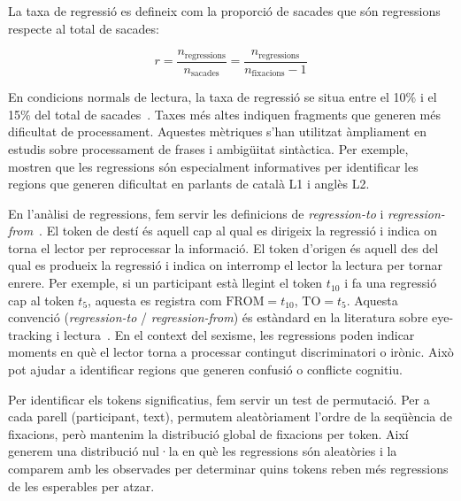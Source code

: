La taxa de regressió es defineix com la proporció de sacades que són regressions respecte al total de sacades:

\[
r = \frac{n_{\text{regressions}}}{n_{\text{sacades}}} = \frac{n_{\text{regressions}}}{n_{\text{fixacions}} - 1}
\]

En condicions normals de lectura, la taxa de regressió se situa entre el 10\% i el 15\% del total de sacades~\cite{rayner2009eye}.
Taxes més altes indiquen fragments que generen més dificultat de processament.
Aquestes mètriques s'han utilitzat àmpliament en estudis sobre processament de frases i ambigüitat sintàctica. Per exemple, \textcite{alvarez2025} mostren que les regressions són especialment informatives per identificar les regions que generen dificultat en parlants de català L1 i anglès L2.

En l'anàlisi de regressions, fem servir les definicions de \textit{regression-to} i \textit{regression-from}~\cite{rayner2009eye}.
El token de destí és aquell cap al qual es dirigeix la regressió i indica on torna el lector per reprocessar la informació. El token d'origen és aquell des del qual es produeix la regressió i indica on interromp el lector la lectura per tornar enrere.
Per exemple, si un participant està llegint el token $t_{10}$ i fa una regressió cap al token $t_{5}$, aquesta es registra com $\text{FROM} = t_{10}$, $\text{TO} = t_{5}$.
Aquesta convenció (\textit{regression-to} / \textit{regression-from}) és estàndard en la literatura sobre eye-tracking i lectura~\cite{rayner2009eye}.
En el context del sexisme, les regressions poden indicar moments en què el lector torna a processar contingut discriminatori o irònic. Això pot ajudar a identificar regions que generen confusió o conflicte cognitiu.

Per identificar els tokens significatius, fem servir un test de permutació.
Per a cada parell (participant, text), permutem aleatòriament l'ordre de la seqüència de fixacions, però mantenim la distribució global de fixacions per token. Així generem una distribució nul·la en què les regressions són aleatòries i la comparem amb les observades per determinar quins tokens reben més regressions de les esperables per atzar.

%

